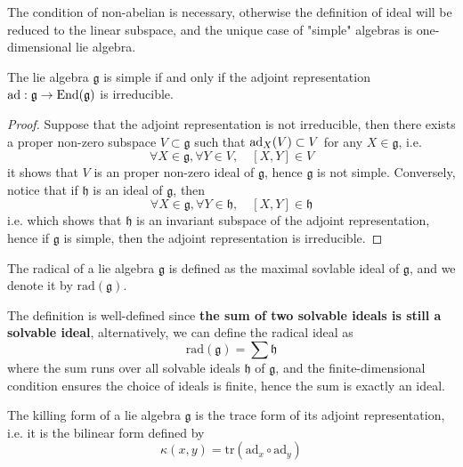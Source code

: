 \begin{remark}
    The condition of non-abelian is necessary, otherwise the definition of ideal will be reduced to the linear subspace, and the unique case of "simple" algebras is one-dimensional lie algebra.
\end{remark}

\begin{proposition}
        The lie algebra \(\mathfrak{g}\) is simple if and only if the adjoint representation \(\operatorname{ad}: \mathfrak{g} \to \operatorname{End}(\mathfrak{g})\) is irreducible.
\end{proposition}

\begin{proof}
    Suppose that the adjoint representation is not irreducible, then there exists a proper non-zero subspace \(V \subset \mathfrak{g}\) such that \(\operatorname{ad}_X(V) \subset V\) for any \(X \in \mathfrak{g}\), i.e.
    \[\forall X \in \mathfrak{g}, \forall Y \in V, \quad [X,Y] \in V\]
    it shows that \(V\) is an proper non-zero ideal of \(\mathfrak{g}\), hence \(\mathfrak{g}\) is not simple. Conversely, notice that if \(\mathfrak{h}\) is an ideal of \(\mathfrak{g}\), then 
    \[\forall X \in \mathfrak{g}, \forall Y \in \mathfrak{h}, \quad [X,Y] \in \mathfrak{h}\]
    i.e. which shows that \(\mathfrak{h}\) is an invariant subspace of the adjoint representation, hence if \(\mathfrak{g}\) is simple, then the adjoint representation is irreducible.
\end{proof}

\begin{colordefinition}
    The radical of a lie algebra \(\mathfrak{g}\) is defined as the maximal sovlable ideal of \(\mathfrak{g}\), and we denote it by \(\mathrm{rad}(\mathfrak{g})\).
\end{colordefinition}

\begin{remark}
    The definition is well-defined since \textbf{the sum of two solvable ideals is still a solvable ideal}, alternatively, we can define the radical ideal as 
    \[\mathrm{rad}(\mathfrak{g}) = \sum \mathfrak{h}\]
    where the sum runs over all solvable ideals \(\mathfrak{h}\) of \(\mathfrak{g}\), and the finite-dimensional condition ensures the choice of ideals is finite, hence the sum is exactly an ideal.
\end{remark}

\begin{definition}
    The killing form of a lie algebra \(\mathfrak{g}\) is the trace form of its adjoint representation, i.e. it is the bilinear form defined by
    \[\kappa(x,y) = \mathrm{tr}(\mathrm{ad}_x \circ \mathrm{ad}_y)\]
\end{definition}


